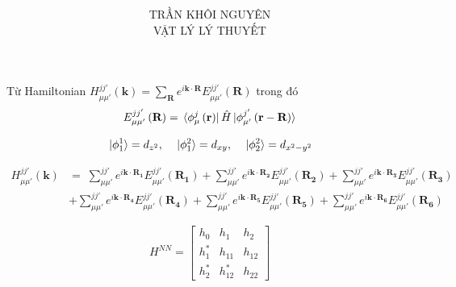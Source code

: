 \documentclass{report}
\title{\Huge{ }}
\begin{document}
\setlength{\parindent}{20pt}
\newpage
\author{TRẦN KHÔI NGUYÊN \\ VẬT LÝ LÝ THUYẾT}
\maketitle




Từ Hamiltonian $H^{jj'}_{\mu\mu'} \left( \mathbf{k}\right) =  \sum_{\mathbf{R}} e^{i \mathbf{k\cdot R}} E^{jj'}_{\mu\mu'} \left(\textbf{R}\right) $
trong đó
\begin{align*}
    E^{jj'}_{\mu\mu'} \left(\textbf{R}\right) = \bra*{\phi^j_\mu \left(\textbf{r}\right)}\hat{H}\ket*{\phi^{j'}_{\mu'}\left(\textbf{r} - \textbf{R}\right)}
\end{align*}

\begin{align*}
    \ket*{\phi^1_1} = d_{z^2} , \quad \ket*{\phi^2_1} = d_{xy} , \quad \ket*{\phi^2_2} = d_{x^2 - y^2}
\end{align*}

\begin{align}
    H^{jj'}_{\mu\mu'} \left( \mathbf{k}\right) & =  \; \sum_{\mu\mu'}^{jj'}
    e^{i \mathbf{k\cdot R_1}} E^{jj'}_{\mu\mu'} \left(\mathbf{R_1}\right)
    + \sum_{\mu\mu'}^{jj'} e^{i \mathbf{k\cdot R_2}} E^{jj'}_{\mu\mu'} \left(\mathbf{R_2}\right)
    + \sum_{\mu\mu'}^{jj'} e^{i \mathbf{k\cdot R_3}} E^{jj'}_{\mu\mu'} \left(\mathbf{R_3}\right) \nonumber                                    \\
                                               & + \sum_{\mu\mu'}^{jj'} e^{i \mathbf{k\cdot R_4}} E^{jj'}_{\mu\mu'} \left(\mathbf{R_4}\right)
    + \sum_{\mu\mu'}^{jj'} e^{i \mathbf{k\cdot R_5}} E^{jj'}_{\mu\mu'} \left(\mathbf{R_5}\right)
    + \sum_{\mu\mu'}^{jj'} e^{i \mathbf{k\cdot R_6}} E^{jj'}_{\mu\mu'} \left(\mathbf{R_6}\right) \nonumber
\end{align}

\[
    \renewcommand{\arraystretch}{0.75}
    H^{NN} = \begin{bmatrix}
        h_{0}   & h_{1}    & h_{2}  \\
        h_{1}^* & h_{11}   & h_{12} \\
        h_{2}^* & h_{12}^* & h_{22}
    \end{bmatrix}
\]
\end{document}
